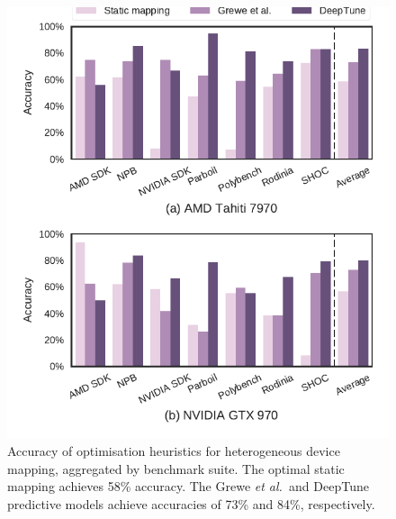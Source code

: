 \begin{figure}
  \centering %
  \includegraphics[width=.8\columnwidth]{img/cgo-acc}%
  \caption[Accuracy of optimisation heuristics for heterogeneous device mapping]{%
    Accuracy of optimisation heuristics for heterogeneous device mapping, aggregated by benchmark suite. The optimal static mapping achieves 58\% accuracy. The Grewe \emph{et al.\ }and DeepTune predictive models achieve accuracies of 73\% and 84\%, respectively.%
  }
  \label{fig:cgo-accuracy}
\end{figure}
